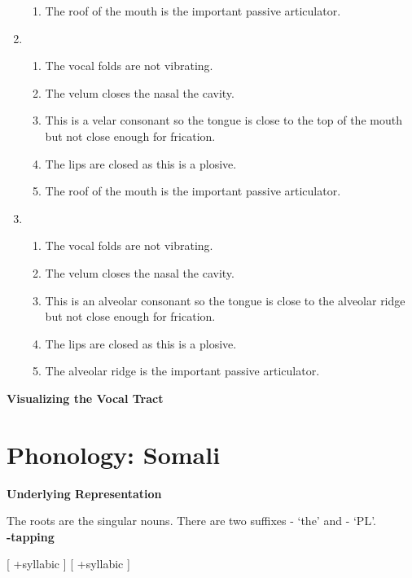 \documentclass[20pt]{article}
\newcommand{\ipa}[1]{\textipa{#1}}
\newcommand{\narrow}[1]{[ \ipa{#1} ]}
\begin{document}
\begin{enumerate}
\begin{enumerate}
      \item The roof of the mouth is the important passive articulator.
    \end{enumerate}
  \item \narrow{k}
    \begin{enumerate}
      \item The vocal folds are not vibrating.
      \item The velum closes the nasal the cavity.
      \item This is a velar consonant so the tongue is close to the top of the
        mouth but not close enough for frication.
      \item The lips are closed as this is a plosive.
      \item The roof of the mouth is the important passive articulator.
    \end{enumerate}
  \item \narrow{t}
    \begin{enumerate}
      \item The vocal folds are not vibrating.
      \item The velum closes the nasal the cavity.
      \item This is an alveolar consonant so the tongue is close to the alveolar
        ridge but not close enough for frication.
      \item The lips are closed as this is a plosive.
      \item The alveolar ridge is the important passive articulator.
    \end{enumerate}
\end{enumerate}

\newpage
\textbf{Visualizing the Vocal Tract}
\newpage

\section{Phonology: Somali}

\textbf{Underlying Representation}

The roots are the singular nouns. There are two suffixes -\ipa{ta} `the' and
-\ipa{o} `PL'. \\

\textbf{\ipa{\:d}-tapping}

\phonb
  {}
  {}
  {[ +syllabic ]}
  {[ +syllabic ]} \\
\end{document}
